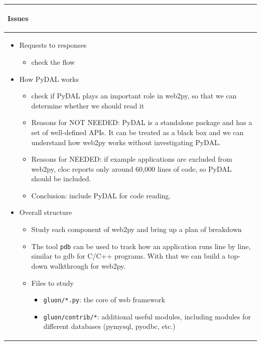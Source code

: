 \documentclass{article}
\begin{document}
\begin{longtable}{|p{\textwidth}|}
\hline
\rowcolor{background}
\begin{center}
\vspace{-1.5em}\textbf{Issues}\vspace{-1em}
\end{center} \\
\hline
\endhead
\begin{itemize}
	\item Requests to responses
	\begin{itemize}
		\item check the flow
	\end{itemize}
	\item How PyDAL works
	\begin{itemize}
		\item check if PyDAL plays an important role in web2py, so that we can determine whether we should read it
		\item Reasons for NOT NEEDED: PyDAL is a standalone package and has a set of well-defined APIs. It can be treated as a black box and we can understand how web2py works without investigating PyDAL.
		\item Reasons for NEEDED: if example applications are excluded from web2py, cloc reports only around 60,000 lines of code, so PyDAL should be included.
		\item Conclusion: include PyDAL for code reading.
	\end{itemize}
	\item Overall structure
	\begin{itemize}
		\item Study each component of web2py and bring up a plan of breakdown
		\item The tool \texttt{pdb} can be used to track how an application runs line by line, similar to gdb for C/C++ programs. With that we can build a top-down walkthrough for web2py.
		\item Files to study
		\begin{itemize}
			\item \texttt{gluon/*.py}: the core of web framework
			\item \texttt{gluon/contrib/*}: additional useful modules, including modules for different databases (pymysql, pyodbc, etc.)
		\end{itemize}
	\end{itemize}
\end{itemize}\\


\end{longtable}
\end{document}

